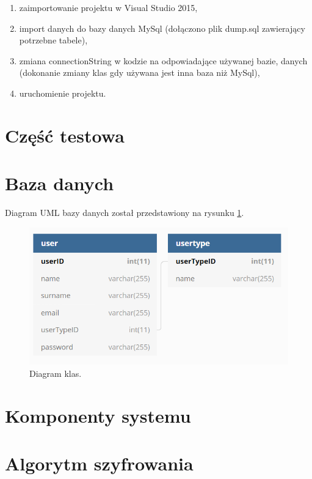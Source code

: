 \documentclass[12pt,a4paper]{article}
\begin{document}
	\begin{enumerate}
		\item zaimportowanie projektu w Visual Studio 2015,
		\item import danych do bazy danych MySql (dołączono plik dump.sql zawierający potrzebne tabele),
		\item zmiana connectionString w kodzie na odpowiadające używanej bazie,
		danych (dokonanie zmiany klas gdy używana jest inna baza niż MySql),
		\item uruchomienie projektu.
	\end{enumerate}
	
\section*{Część testowa}


	
\section*{Baza danych}
Diagram UML bazy danych został przedstawiony na rysunku \ref{fig:dbdiagram}.


\begin{figure}[h]
	\centering
	\centerline{
	\includegraphics[width=0.9\linewidth]{media/dbdiagram}
	}
	\caption{Diagram klas.}
	\label{fig:dbdiagram}
\end{figure}



\section*{Komponenty systemu}


	
\section*{Algorytm szyfrowania}
	
\end{document}
